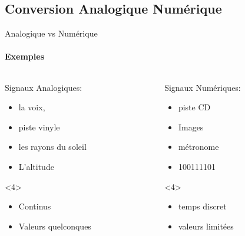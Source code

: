 \documentclass{beamer}
\begin{document}
\subsection{Conversion Analogique Numérique}
\begin{frame}{Analogique vs Numérique}
  \framesubtitle{Exemples}
  \begin{columns}
    \begin{column}{.5\textwidth}
      Signaux Analogiques:\pause[1]
      \begin{itemize}
        \item la voix,
        \item piste vinyle
        \item les rayons du soleil
        \item L'altitude
      \end{itemize}
      \pause[2]
      \begin{block}<4>{}
        \begin{itemize}
          \item Continus
          \item Valeurs quelconques
        \end{itemize}
      \end{block}
    \end{column}
    \begin{column}{.5\textwidth}
      Signaux Numériques:\pause[3]
      \begin{itemize}
        \item piste CD
        \item Images
        \item métronome
        \item 100111101
      \end{itemize}
      \begin{block}<4>{}
        \begin{itemize}
          \item temps discret
          \item valeurs limitées
        \end{itemize}
      \end{block}
    \end{column}
  \end{columns}
\end{frame}
\end{document}
